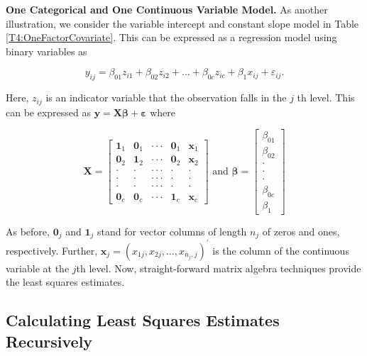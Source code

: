 \textbf{One Categorical and One Continuous Variable Model.} As
another illustration, we consider the variable intercept and
constant slope model in Table \ref{T4:OneFactorCovariate}. This can
be expressed as a regression model using binary variables as

\begin{center}
\[
y_{ij}=\beta_{01}z_{i1}+\beta_{02}z_{i2}+\ldots+\beta
_{0c}z_{ic}+\beta_1x_{ij}+\varepsilon_{ij}.
\]
\end{center}

\noindent Here, $z_{ij}$ is an indicator variable that the observation falls in the $j$%
th level. This can be expressed as $\mathbf{y}=%
\mathbf{X \boldsymbol \beta + \boldsymbol \varepsilon}$ where

\begin{equation}\label{E4:CategoricalContinuous}
\mathbf{X}=%
\begin{bmatrix}
\mathbf{1}_1 & \mathbf{0}_1 & \cdot \cdot \cdot  & \mathbf{0}%
_1 & \mathbf{x}_1 \\
\mathbf{0}_2 & \mathbf{1}_2 & \cdot \cdot \cdot  & \mathbf{0}%
_2 & \mathbf{x}_2 \\
\cdot  & \cdot  & \cdot \cdot \cdot  & \cdot  & \cdot  \\
\cdot  & \cdot  & \cdot \cdot \cdot  & \cdot  & \cdot  \\
\cdot  & \cdot  & \cdot \cdot \cdot  & \cdot  & \cdot  \\
\mathbf{0}_{c} & \mathbf{0}_{c} & \cdot \cdot \cdot  & \mathbf{1}_c & \mathbf{x}_{c}%
\end{bmatrix}%
\text{ \ \ \ \ and \ \ \ }\boldsymbol \beta=
\begin{bmatrix}
\beta_{01} \\
\beta_{02} \\
\cdot  \\
\cdot  \\
\cdot  \\
\beta_{0c} \\
\beta_1%
\end{bmatrix}
\end{equation}

\noindent As before, $\mathbf{0}_j$ and $\mathbf{1}_j$ stand for
vector columns of length $n_j$ of zeros and ones, respectively.
Further, $\mathbf{x}_j=(x_{1j},x_{2j},\ldots,x_{n_j,j})^{\prime}$ is
the column of the continuous variable at the $j$th level. Now,
straight-forward matrix algebra techniques provide the least squares
estimates.

\subsection{Calculating Least Squares Estimates Recursively}\label{S4:MatrixSuccess}

